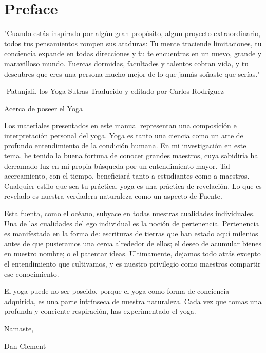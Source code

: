 \chapter{Preface}
"Cuando estás inspirado por algún gran propósito, algun proyecto extraordinario, todos tus pensamientos rompen sus ataduras: Tu mente traciende limitaciones, tu conciencia expande en todas direcciones y tu te encuentras en un nuevo, grande y maravilloso mundo. Fuercas dormidas, facultades y talentos cobran vida, y tu descubres que eres una persona mucho mejor de lo que jamás soñaste que serías."

-Patanjali, los Yoga Sutras
\newpage
Traducido y editado por Carlos Rodríguez


\newpage
Acerca de poseer el Yoga

Los materiales presentados en este manual representan una composición e interpretación personal del yoga. Yoga es tanto una ciencia como un arte de profundo entendimiento de la condición humana. En mi investigación en este tema, he tenido la buena fortuna de conocer grandes maestros, cuya sabidiría ha derramado luz en mi propia búsqueda por un entendimiento mayor. Tal acercamiento, con el tiempo, beneficiará tanto a estudiantes como a maestros. Cualquier estilo que sea tu práctica, yoga es una práctica de revelación. Lo que es revelado es nuestra verdadera naturaleza como un aspecto de Fuente.

Esta fuenta, como el océano, subyace en todas nuestras cualidades individuales. Una de las cualidades del ego individual es la noción de pertenencia. Pertenencia es manifestada en la forma de: escrituras de tierras que han estado aquí milenios antes de que pusieramos una cerca alrededor de ellos; el deseo de acumular bienes en nuestro nombre; o el patentar ideas. Ultimamente, dejamos todo atrás excepto el entendimiento que cultivamos, y es nuestro privilegio como maestros compartir ese conocimiento.

El yoga puede no ser poseido, porque el yoga como forma de conciencia adquirida, es una parte intrínseca de nuestra naturaleza. Cada vez que tomas una profunda y conciente respiración, has experimentado el yoga.

Namaste,

Dan Clement
